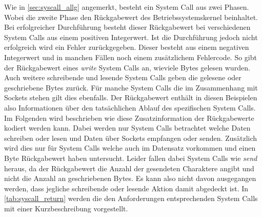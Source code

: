                     Wie in \autoref{sec:syscall_allg} angemerkt, besteht ein System Call aus zwei \glqq Phasen\grqq.
                    Wobei die zweite Phase den Rückgabewert des Betriebssystemskernel beinhaltet.
                    Bei erfolgreicher Durchführung besteht dieser Rückgabewert bei verschiedenen System Calls aus einem positiven Integerwert.
                    Ist die Durchführung jedoch nicht erfolgreich wird ein Fehler zurückgegeben.
                    Dieser besteht aus einem negativen Integerwert und in manchen Fällen noch einem zusätzlichem Fehlercode.
                    So gibt der Rückgabewert eines \textit{write} System Calls an, wieviele Bytes gelesen wurden.
                    Auch weitere schreibende und lesende System Calls geben die gelesene oder geschriebene Bytes zurück.
                    Für manche System Calls die im Zusammenhang mit Sockets stehen gilt dies ebenfalls.
                    Der Rückgabewert enthält in diesen Beispielen also Informationen über den tatsächlichen Ablauf des spezifischen System Calls.
                    Im Folgenden wird beschrieben wie diese Zusatzinformation der Rückgabewerte kodiert werden kann.
                    Dabei werden nur System Calls betrachtet welche Daten schreiben oder lesen und Daten über Sockets empfangen oder senden. 
                    Zusätzlich wird dies nur für System Calls welche auch im Datensatz vorkommen und einen Byte Rückgabewert haben untersucht.
                    Leider fallen dabei System Calls wie \textit{send} heraus, da der Rückgabewert die Anzahl der gesendeten Charaktere angibt und nicht die Anzahl an geschriebenen Bytes.
                    Es kann also nicht davon ausgegangen werden, dass jegliche schreibende oder lesende Aktion damit abgedeckt ist.
                    In \autoref{tab:syscall_return} werden die den Anforderungen entsprechenden System Calls mit einer Kurzbeschreibung vorgestellt.

